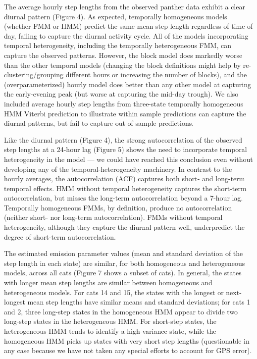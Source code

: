 \documentclass{bmcart}
\begin{document}
The average hourly step lengths from the observed panther data exhibit
a clear diurnal pattern (Figure 4). As expected, temporally
homogeneous models (whether FMM or HMM) predict the same mean step
length regardless of time of day, failing to capture the diurnal
activity cycle. All of the models incorporating temporal
heterogeneity, including the temporally heterogeneous FMM, can capture
the observed patterns. However, the block model does markedly worse
than the other temporal models (changing the block definitions might
help by re-clustering/grouping different hours or increasing the
number of blocks), and the (overparameterized) hourly model does
better than any other model at capturing the early-evening peak (but
worse at capturing the mid-day trough). We also included average
hourly step lengths from three-state temporally homogeneous HMM
Viterbi prediction to illustrate within sample predictions can capture
the diurnal patterns, but fail to capture out of sample predictions.

Like the diurnal pattern (Figure 4),
the strong autocorrelation of the observed step lengths at a 24-hour lag (Figure 5) shows the need to incorporate temporal heterogeneity in the model --- we could have reached this conclusion even without developing any of the temporal-heterogeneity machinery.
In contrast to the hourly averages, the autocorrelation (ACF) captures both short- and long-term temporal effects. HMM without temporal heterogeneity captures the short-term autocorrelation, but misses the long-term autocorrelation beyond a 7-hour lag.
Temporally homogeneous FMMs, by definition, produce no autocorrelation (neither short- nor long-term autocorrelation). FMMs without temporal heterogeneity, although they capture the diurnal pattern well, underpredict the degree of short-term autocorrelation.

The estimated emission parameter values
(mean and standard deviation of the step length in each state)
are similar, for both homogeneous and heterogeneous
models, across all cats (Figure 7 shows a subset of cats). 
In general, the states with longer mean step lengths are
similar between homogeneous and heterogeneous models. For cats 14 and 15, the states with
the longest or next-longest mean step lengths have similar means
and standard deviations; for cats 1 and 2, three long-step states
in the homogeneous HMM appear to divide two long-step states in 
the heterogeneous HMM. For short-step states, the heterogeneous HMM
tends to identify a high-variance state, while the homogeneous HMM
picks up states with very short step lengths (questionable in any
case because we have not taken any special efforts to account for
GPS error).
\end{document}
